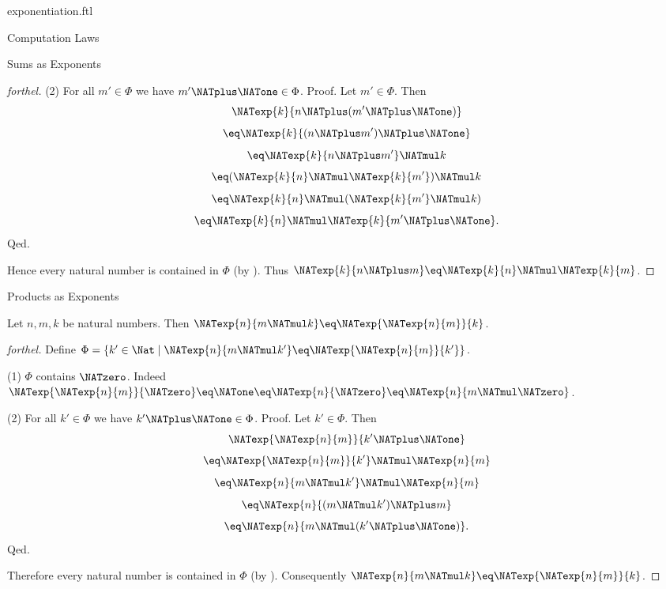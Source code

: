 \documentclass{naproche-library}
\begin{document}
\begin{smodule}[title=Exponentiation]{exponentiation.ftl}
\begin{sfragment}{Computation Laws}
\begin{sfragment}{Sums as Exponents}
\begin{proof}[forthel]
      (2) For all $m' \in \Phi$ we have $m' \NATplus \NATone \in \Phi$. \newline
      Proof.
        Let $m' \in \Phi$.
        Then
        \[  \NATexp{k}{n \NATplus (m' \NATplus \NATone)}                  \]
        \[    \eq \NATexp{k}{(n \NATplus m') \NATplus \NATone}              \]
        \[    \eq \NATexp{k}{n \NATplus m'} \NATmul k            \]
        \[    \eq (\NATexp{k}{n} \NATmul \NATexp{k}{m'}) \NATmul k  \]
        \[    \eq \NATexp{k}{n} \NATmul (\NATexp{k}{m'} \NATmul k)  \]
        \[    \eq \NATexp{k}{n} \NATmul \NATexp{k}{m' \NATplus \NATone}.       \]
      Qed.

      Hence every natural number is contained in $\Phi$ (by ).
      Thus $\NATexp{k}{n \NATplus m} \eq \NATexp{k}{n} \NATmul \NATexp{k}{m}$.
    \end{proof}
  \end{sfragment}

  \begin{sfragment}{Products as Exponents}
    \begin{proposition}[forthel,id=ARITHMETIC_09_7827956571308032]
      Let $n, m, k$ be natural numbers.
      Then $\NATexp{n}{m \NATmul k} \eq \NATexp{\NATexp{n}{m}}{k}$.
    \end{proposition}
    \begin{proof}[forthel]
      Define $\Phi = \{ k' \in \Nat \mid \NATexp{n}{m \NATmul k'} \eq \NATexp{\NATexp{n}{m}}{k'} \}$.

      (1) $\Phi$ contains $\NATzero$.
      Indeed $\NATexp{\NATexp{n}{m}}{\NATzero}
        \eq \NATone
        \eq \NATexp{n}{\NATzero}
        \eq \NATexp{n}{m \NATmul \NATzero}$.

      (2) For all $k' \in \Phi$ we have $k' \NATplus \NATone \in \Phi$. \newline
      Proof.
        Let $k' \in \Phi$.
        Then
        \[  \NATexp{\NATexp{n}{m}}{k' \NATplus \NATone}                \]
        \[    \eq \NATexp{\NATexp{n}{m}}{k'} \NATmul \NATexp{n}{m}    \]
        \[    \eq \NATexp{n}{m \NATmul k'} \NATmul \NATexp{n}{m}  \]
        \[    \eq \NATexp{n}{(m \NATmul k') \NATplus m}        \]
        \[    \eq \NATexp{n}{m \NATmul (k' \NATplus \NATone)}.       \]
      Qed.

      Therefore every natural number is contained in $\Phi$ (by ).
      Consequently $\NATexp{n}{m \NATmul k} \eq \NATexp{\NATexp{n}{m}}{k}$.
    \end{proof}
  \end{sfragment}


\end{sfragment}
\end{smodule}
\end{document}
